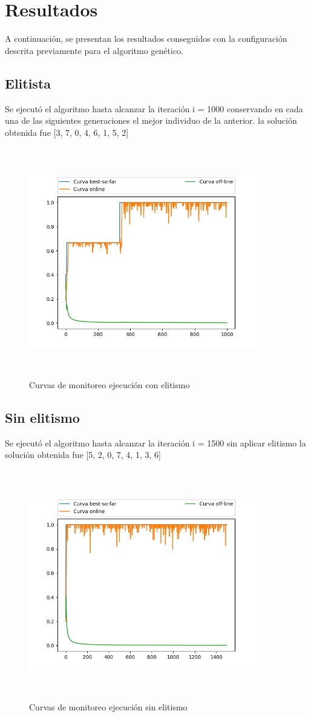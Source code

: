 \documentclass[11pt]{article}
\begin{document}
\section{Resultados}
A continuaci\'on, se presentan los resultados conseguidos con la configuraci\'on
descrita previamente para el algoritmo gen\'etico.
\subsection{Elitista}
Se ejecut\'o el algoritmo hasta alcanzar la iteraci\'on i = 1000  conservando en cada una de las siguientes 
generaciones el mejor individuo de la anterior.
la soluci\'on obtenida fue [3, 7, 0, 4, 6, 1, 5, 2]
\begin{figure}[t]
    \includegraphics[width=10cm, height=10cm]{Figure_1}
    \centering
    \caption{Curvas de monitoreo ejecuci\'on con elitismo}
    \end{figure}
\subsection{Sin elitismo}
Se ejecut\'o el algoritmo hasta alcanzar la iteraci\'on i = 1500 sin aplicar elitismo la soluci\'on obtenida fue [5, 2, 0, 7, 4, 1, 3, 6] 
\begin{figure}[h]
    \includegraphics[width=10cm, height=10cm]{Figure_2}
    \centering
    \caption{Curvas de monitoreo ejecuci\'on sin elitismo}
    \end{figure}
\end{document}
